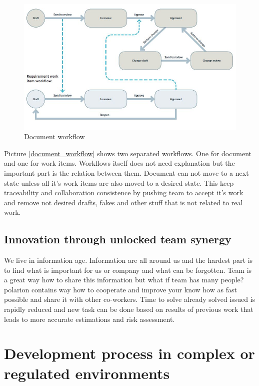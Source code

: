 \documentclass[thesis=M,english]{FITthesis}[2012/06/26]
\begin{document}
\begin{figure}[h!]\centering
	\includegraphics[width=1\textwidth]{pictures/document_workflow}
	\caption{Document workflow \cite{polarion_alm}}\label{fig:document_workflow}
\end{figure}

Picture \ref{document_workflow} shows two separated workflows. One for document and one for work items. Workflows itself does not need explanation but the important part is the relation between them. Document can not move to a next state unless all it's work items are also moved to a desired state. This keep traceability and collaboration consistence by pushing team to accept it's work and remove not desired drafts, fakes and other stuff that is not related to real work. 

\subsection{Innovation through unlocked team synergy}

We live in information age. Information are all around us and the hardest part is to find what is important for us or company and what can be forgotten. Team is a great way how to share this information but what if team has many people? \acrshort{polarion} contains way how to cooperate and improve your know how as fast possible and share it with other co-workers. Time to solve already solved issued is rapidly reduced and new task can be done based on results of previous work that leads to more accurate estimations and risk assessment.

\section{Development process in complex or regulated environments}
\end{document}
